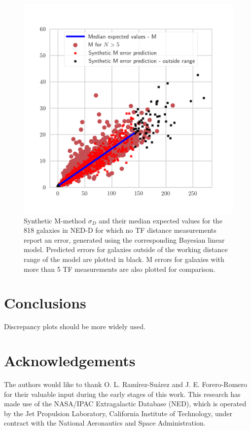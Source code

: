 \documentclass[a4paper,fleqn,usenatbib]{mnras}
\begin{document}
\begin{figure}
	\includegraphics[scale=0.7]{predl2.png}
    \caption{Synthetic M-method $\sigma_D$ and their median expected values for the 818 galaxies in NED-D for which no TF distance measurements report an error, generated using the corresponding Bayesian linear model. Predicted errors for galaxies outside of the working distance range of the model are plotted in black. M errors for galaxies with more than 5 TF measurements are also plotted for comparison.}
    \label{fig:predl2}
\end{figure}

\section{Conclusions}

Discrepancy plots should be more widely used. 

\section*{Acknowledgements}

The authors would like to thank O. L. Ram\'irez-Su\'arez and J. E. Forero-Romero for their valuable input during the early stages of this work. This research has made use of the NASA/IPAC Extragalactic Database (NED), which is operated by the Jet Propulsion Laboratory, California Institute of Technology, under contract with the National Aeronautics and Space Administration.
\end{document}
